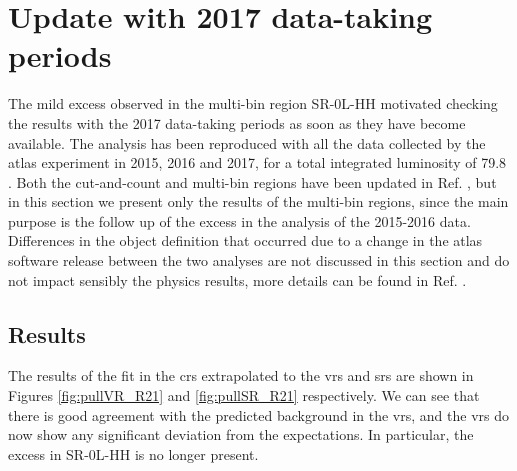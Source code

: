 \section{Update with 2017 data-taking periods}
\label{sec:strong:r21}

The mild excess observed in the multi-bin region SR-0L-HH motivated checking the results with the 2017 data-taking periods 
as soon as they have become available. 
The analysis has been reproduced with all the data collected by the \gls{atlas} experiment in 2015, 2016 and 2017, 
for a total integrated luminosity of 79.8 \ifb. 
Both the cut-and-count and multi-bin regions have been updated in Ref. \cite{ATLAS-CONF-2018-041}, 
but in this section we present only the results 
of the multi-bin regions, since the main purpose is the follow up of the excess in the analysis of the 2015-2016 data.
Differences in the object definition that occurred due to a change in the \gls{atlas} software release between the 
two analyses are not discussed in this section and do not impact sensibly the physics results, more details can be found 
in Ref. \cite{ATLAS-CONF-2018-041}.


\subsection{Results}

The results of the fit in the \glspl{cr} extrapolated to the \glspl{vr} and \glspl{sr} are shown in Figures 
\ref{fig:pullVR_R21} and \ref{fig:pullSR_R21} respectively. 
We can see that there is good agreement with the predicted background in the \glspl{vr}, and the \glspl{vr} do now show any 
significant deviation from the expectations. 
In particular, the excess in SR-0L-HH is no longer present. 


